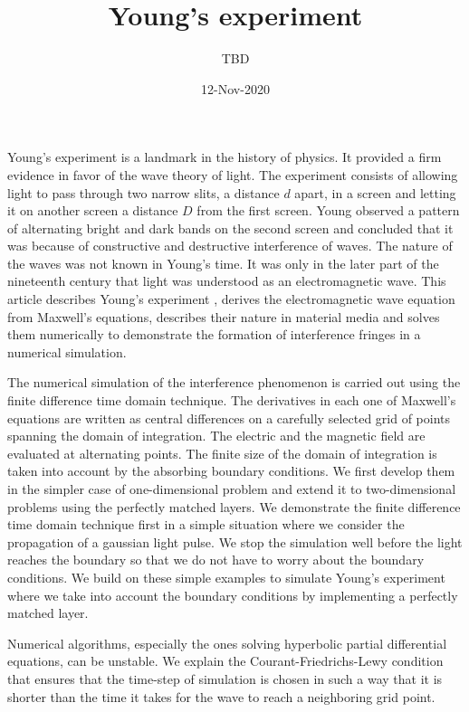 \documentclass[11pt]{article}
\title{Young's experiment}
\author{TBD}
\date{12-Nov-2020}
\begin{document}
\maketitle
Young's experiment is a landmark in the history of physics. It provided a firm
evidence in favor of the wave theory of light. The experiment consists of
allowing light to pass through two narrow slits, a distance $d$ apart, in a 
screen and letting it on another screen a distance $D$ from the first screen.
Young observed a pattern of alternating bright and dark bands on the second 
screen and concluded that it was because of constructive and destructive
interference of waves. The nature of the waves was not known in Young's time.
It was only in the later part of the nineteenth century that light was
understood as an electromagnetic wave. This article describes Young's experiment
, derives the electromagnetic wave equation from Maxwell's equations, describes
their nature in material media and solves them numerically to demonstrate the
formation of interference fringes in a numerical simulation.

The numerical simulation of the interference phenomenon is carried out using
the finite difference time domain technique. The derivatives in each one of 
Maxwell's equations are written as central differences on a carefully selected
grid of points spanning the domain of integration. The electric and the magnetic
field are evaluated at alternating points. The finite size of the domain of
integration is taken into account by the absorbing boundary conditions. We
first develop them in the simpler case of one-dimensional problem and extend
it to two-dimensional problems using the perfectly matched layers. We
demonstrate the finite difference time domain technique first in a simple 
situation where we consider the propagation of a gaussian light pulse. We stop
the simulation well before the light reaches the boundary so that we do not
have to worry about the boundary conditions. We build on these simple examples
to simulate Young's experiment where we take into account the boundary
conditions by implementing a perfectly matched layer.

Numerical algorithms, especially the ones solving hyperbolic partial
differential equations, can be unstable. We explain the 
Courant-Friedrichs-Lewy condition that ensures that the time-step of simulation
is chosen in such a way that it is shorter than the time it takes for the 
wave to reach a neighboring grid point.
\end{document}
